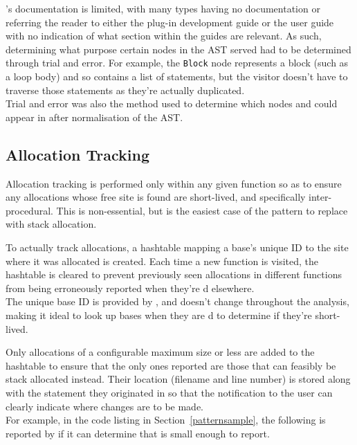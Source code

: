 's documentation is limited, with many types having no documentation or referring the reader to either the plug-in development guide or the user guide with no indication of what section within the guides are relevant. As such, determining what purpose certain nodes in the AST served had to be determined through trial and error. For example, the \texttt{Block} node represents a block (such as a loop body) and so contains a list of statements, but the visitor doesn't have to traverse those statements as they're actually duplicated.\\
Trial and error was also the method used to determine which nodes \malloc{} and \free{} could appear in after normalisation of the AST\@.

\subsection{Allocation Tracking}\label{alloctrack}

Allocation tracking is performed only within any given function so as to ensure any allocations whose free site is found are short-lived, and specifically inter-procedural. This is non-essential, but is the easiest case of the pattern to replace with stack allocation.

To actually track allocations, a hashtable mapping a base's unique ID to the site where it was allocated is created. Each time a new function is visited, the hashtable is cleared to prevent previously seen allocations in different functions from being erroneously reported when they're \free{}d elsewhere.\\
The unique base ID is provided by , and doesn't change throughout the analysis, making it ideal to look up bases when they are \free{}d to determine if they're short-lived.

Only allocations of a configurable maximum size or less are added to the hashtable to ensure that the only ones reported are those that can feasibly be stack allocated instead. Their location (filename and line number) is stored along with the statement they originated in so that the notification to the user can clearly indicate where changes are to be made.\\
For example, in the code listing in Section~\ref{patternsample}, the following is reported by  if it can determine that  is small enough to report.



